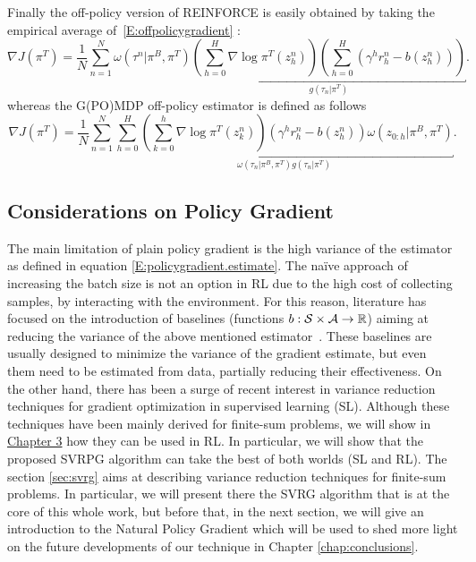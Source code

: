 Finally the off-policy version of REINFORCE is easily obtained by taking the empirical average of~\eqref{E:offpolicygradient} \citep{mastrangelo2015study}:
\[
\nabla J(\pi^T) = \frac{1}{N} \sum_{n=1}^{N} \omega(\tau^n|\pi^B, \pi^T)
\underbracket{
	\left(\sum_{h=0}^{H} \nabla \log \pi^{T}(z_h^n) \right)\left(\sum_{h=0}^{H}\left(\gamma^h r_h^n - b(z_h^n)\right)\right)
}_{g(\tau_n|\pi^T)}.
\]
whereas the G(PO)MDP off-policy estimator is defined as follows \citep{mastrangelo2015study}
\[
\nabla J(\pi^T) = \frac{1}{N} \sum_{n=1}^{N}
\underbracket{
	\sum_{h=0}^H \left(\sum_{k=0}^h \nabla \log\pi^T(z_k^n)\right) \left(\gamma^h r_h^n - b(z_h^n)\right) \omega(z_{0:h}|\pi^B,\pi^T)
}_{\omega(\tau_n|\pi^B,\pi^T)g(\tau_n|\pi^T)}.
\]
\subsection{Considerations on Policy Gradient}
The main limitation of plain policy gradient is the high variance of the estimator as defined in equation \ref{E:policygradient.estimate}.
The na\"ive approach of increasing the batch size is not an option in \acs{RL} due to the high cost of collecting samples, \ie by interacting with the environment.
For this reason, literature has focused on the introduction of baselines (\ie functions $b : \mathcal{S} \times \mathcal{A} \to \mathbb R$) aiming at reducing the variance of the above mentioned estimator~\citep[\eg][]{williams1992simple,Peters2008reinf,Thomas2017actionbaseline,wu2018variance}.
These baselines are usually designed to minimize the variance of the gradient estimate, but even them need to be estimated from data, partially reducing their effectiveness.
On the other hand, there has been a surge of recent interest in variance reduction techniques for gradient optimization in supervised learning (\acs{SL}).
Although these techniques have been mainly derived for finite-sum problems, we will show in \hyperref[chap:svrpg]{Chapter 3} how they can be used in \acs{RL}.
In particular, we will show that the proposed \acs{SVRPG} algorithm can take the best of both worlds (\ie \acs{SL} and \acs{RL}).
The section \ref{sec:svrg} aims at describing variance reduction techniques for finite-sum problems. In particular, we will present there the \acs{SVRG} algorithm that is at the core of this whole work, but before that, in the next section, we will give an introduction to the Natural Policy Gradient which will be used to shed more light on the future developments of our technique in Chapter  \ref{chap:conclusions}.


